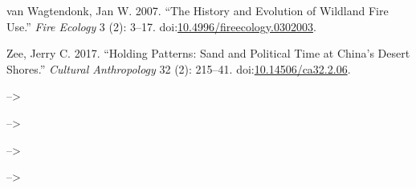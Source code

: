 \documentclass[
]{article}
\newlength{\cslhangindent}
\newenvironment{CSLReferences}[2] %
 {\begin{list}{}{%
  \setlength{\itemindent}{0pt}
  \setlength{\leftmargin}{0pt}
  \setlength{\parsep}{0pt}
  \ifodd #1
   \setlength{\leftmargin}{\cslhangindent}
   \setlength{\itemindent}{-1\cslhangindent}
  \fi
  \setlength{\itemsep}{#2\baselineskip}}}
 {\end{list}}
\begin{document}
\begin{CSLReferences}{1}{0}
van Wagtendonk, Jan W. 2007. {``The {History} and {Evolution} of {Wildland Fire Use}.''} \emph{Fire Ecology} 3 (2): 3--17. doi:\href{https://doi.org/10.4996/fireecology.0302003}{10.4996/fireecology.0302003}.

Zee, Jerry C. 2017. {``Holding {Patterns}: {Sand} and {Political Time} at {China}'s {Desert Shores}.''} \emph{Cultural Anthropology} 32 (2): 215--41. doi:\href{https://doi.org/10.14506/ca32.2.06}{10.14506/ca32.2.06}.

\end{CSLReferences}

\clearpage

\setlength{\parindent}{4em} 
\linespread{1}
\doublespacing

--\textgreater{}

--\textgreater{}

--\textgreater{}

--\textgreater{}
\end{document}
